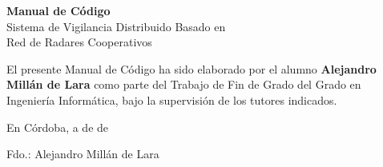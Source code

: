 \thispagestyle{empty}

\vspace*{2cm}

\begin{center}
    {\Large \textbf{Manual de Código}}\\[0.5em]
    {\large Sistema de Vigilancia Distribuido Basado en\\
    Red de Radares Cooperativos}
\end{center}

\vspace{1.5cm}

\noindent
El presente Manual de Código ha sido elaborado por el alumno
\textbf{Alejandro Millán de Lara} como parte del Trabajo de Fin de Grado del
Grado en Ingeniería Informática, bajo la supervisión de los tutores indicados.

\vfill

\noindent
En Córdoba, a \hspace{1cm} de \hspace{3cm} de \the\year

\vspace{2.5cm}

\begin{flushright}
    \begin{minipage}{0.45\textwidth}
        \centering
        Fdo.: Alejandro Millán de Lara
    \end{minipage}
\end{flushright}

\clearpage
